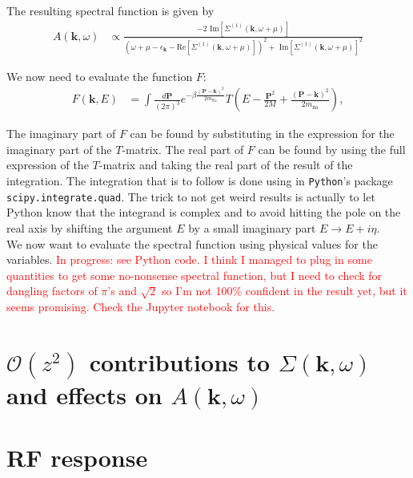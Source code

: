 \documentclass{article}
\theoremstyle{definition}
\begin{document}
\noindent The resulting spectral function is given by 
\begin{align}
A(\mathbf{k}, \omega) 
&\propto
\frac
{-2 \text{ Im}[\Sigma^{(1)}(\mathbf{k}, \omega + \mu)]}
{
(\omega + \mu -\epsilon_\mathbf{k} - \text{Re}[\Sigma^{(1)}(\mathbf{k}, \omega + \mu)])^2 
+
\text{ Im}[\Sigma^{(1)}(\mathbf{k}, \omega + \mu)]^2
}
\end{align}

\noindent We now need to evaluate the function $F$:
\begin{align}
F(\mathbf{k}, E) 
&= \int \frac{d\mathbf{P}}{(2\pi)^3} e^{-\beta \frac{(\mathbf{P} - \mathbf{k})^2}{2m_\text{Na}}} 
T\left( E - \frac{\mathbf{P}^2}{2M} + \frac{(\mathbf{P} - \mathbf{k})^2}{2m_\text{na}} \right),
\end{align}

\noindent The imaginary part of $F$ can be found by substituting in the expression for the imaginary part of the $T$-matrix. The real part of $F$ can be found by using the full expression of the $T$-matrix and taking the real part of the result of the integration. The integration that is to follow is done using in \texttt{Python}'s package \texttt{scipy.integrate.quad}. The trick to not get weird results is actually to let Python know that the integrand is complex and to avoid hitting the pole on the real axis by shifting the argument $E$ by a small imaginary part $E \to E + i\eta$. \\

\noindent We now want to evaluate the spectral function using physical values for the variables. \textcolor{red}{In progress: see Python code. I think I managed to plug in some quantities to get some no-nonsense spectral function, but I need to check for dangling factors of $\pi$'s and $\sqrt{2}$ so I'm not 100\% confident in the result yet, but it seems promising. Check the Jupyter notebook for this.}


\section{$\mathcal{O}(z^2)$ contributions to $\Sigma(\mathbf{k},\omega)$ and effects on $A(\mathbf{k}, \omega)$}




\section{RF response}
\end{document}
